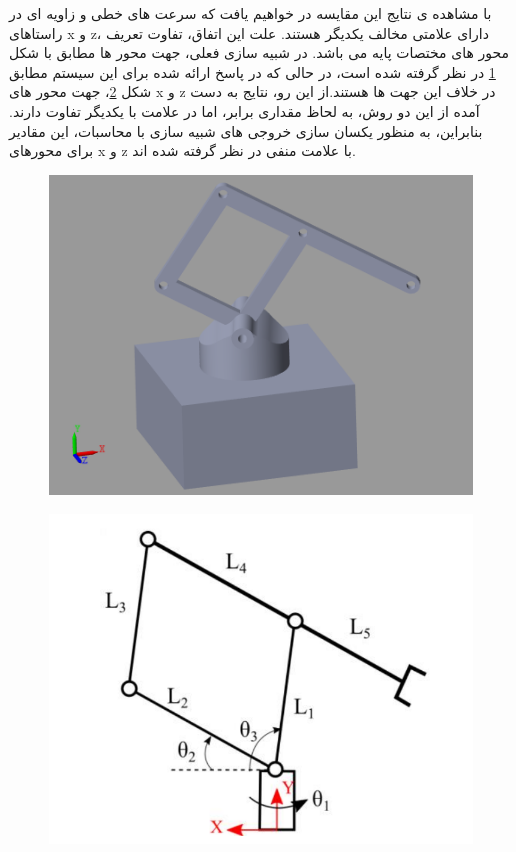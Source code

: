 \FloatBarrier
با مشاهده ی نتایج این مقایسه در خواهیم یافت که سرعت های خطی و زاویه ای در راستاهای x و z، دارای علامتی مخالف یکدیگر هستند. علت این اتفاق، تفاوت تعریف محور های مختصات پایه می باشد. در شبیه سازی فعلی، جهت محور ها مطابق با شکل   \ref{fig:robot} در نظر گرفته شده است، در حالی که در پاسخ ارائه شده برای این سیستم مطابق شکل \ref{fig:solutionaxes}، جهت محور های x و z در خلاف این جهت ها هستند.از این رو، نتایج به دست آمده از این دو روش، به لحاظ مقداری برابر، اما در علامت با یکدیگر تفاوت دارند.
بنابراین، به منظور یکسان سازی خروجی های شبیه سازی با محاسبات، این مقادیر برای محورهای x و z با علامت منفی در نظر گرفته شده اند.

\begin{figure}[htbp]
	\centering
	\includegraphics[width=0.7\linewidth]{../img/robot}
	\caption{}
	\label{fig:robot}
\end{figure}
\begin{figure}[htbp]
	\centering
	\includegraphics[width=0.7\linewidth]{../img/Solution_Axes}
	\caption{}
	\label{fig:solutionaxes}
\end{figure}
